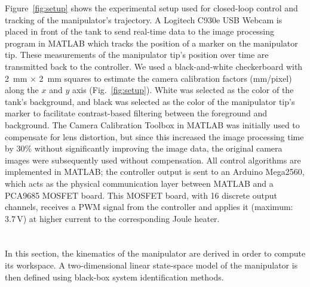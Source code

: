 Figure~\ref{fig:setup} shows the experimental setup used for closed-loop control and tracking of the manipulator's trajectory. A Logitech C930e USB Webcam is placed in front of the tank to send real-time data to the image processing program in MATLAB which tracks the position of a marker on the manipulator tip. These measurements of the manipulator tip's position over time are transmitted back to the controller. We used a black-and-white checkerboard with 2~mm $\times$ 2~mm squares to estimate the camera calibration factors (mm/pixel) along the $x$ and $y$ axis (Fig.~\ref{fig:setup}). White was selected as the color of the tank's background, and black was selected as the color of the manipulator tip's marker to facilitate contrast-based filtering between the foreground and background. The Camera Calibration Toolbox in MATLAB was initially used to compensate for lens distortion, but since this increased the image processing time by 30\% without significantly improving the image data, the original camera images were subsequently used without compensation. All control algorithms are implemented in MATLAB; the controller output is sent to an Arduino Mega2560, which acts as the physical communication layer between MATLAB and a  PCA9685 MOSFET board. This MOSFET board, with 16 discrete output channels, receives a PWM signal from the controller and applies it (maximum: 3.7\,V) at higher current to the corresponding Joule heater.

\section{}

In this section, the kinematics of the manipulator are derived in order to compute its workspace. A two-dimensional linear state-space model of the manipulator is then defined using black-box system identification methods. 


